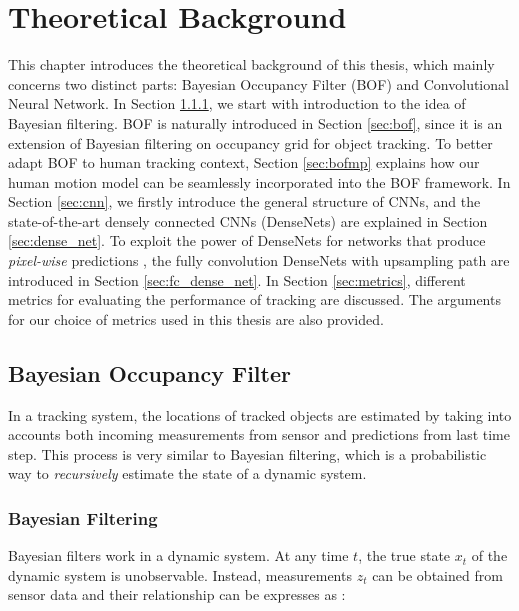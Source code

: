 \chapter{Theoretical Background} \label{chapter:3}

This chapter introduces the theoretical background of this thesis, which mainly concerns two distinct parts: Bayesian Occupancy Filter (BOF) and Convolutional Neural Network. In Section \ref{sec:bayes_filtering}, we start with introduction to the idea of Bayesian filtering. BOF is naturally introduced in Section \ref{sec:bof}, since it is an extension of Bayesian filtering on occupancy grid for object tracking. To better adapt BOF to human tracking context, Section \ref{sec:bofmp} explains how our human motion model can be seamlessly incorporated into the BOF framework. In Section \ref{sec:cnn}, we firstly introduce the general structure of CNNs, and the state-of-the-art densely connected CNNs (DenseNets) are explained in Section \ref{sec:dense_net}. To exploit the power of DenseNets for networks that produce \textit{pixel-wise} predictions , the fully convolution DenseNets with upsampling path are introduced in Section \ref{sec:fc_dense_net}. In Section \ref{sec:metrics}, different metrics for evaluating the performance of tracking are discussed. The arguments for our choice of metrics used in this thesis are also provided. 

\section{Bayesian Occupancy Filter} 

In a tracking system, the locations of tracked objects are estimated by taking into accounts both incoming measurements from sensor and predictions from last time step. This process is very similar to Bayesian filtering, which is a probabilistic way to \textit{recursively} estimate the state of a dynamic system.

\subsection{Bayesian Filtering} \label{sec:bayes_filtering}

Bayesian filters work in a dynamic system. At any time $t$, the true state $x_t$ of the dynamic system is unobservable. Instead, measurements $z_t$ can be obtained from sensor data and their relationship can be expresses as \citep{jazwinski2007stochastic}:

